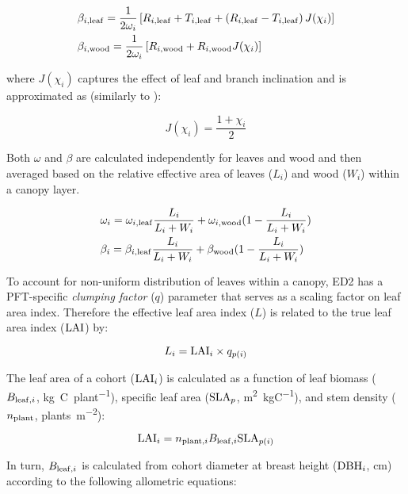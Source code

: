 \begin{align}
  & \beta_{i, \mathrm{leaf}} = \frac{1}{2 \omega_{i}} \left[R_{i, \mathrm{leaf}} + T_{i, \mathrm{leaf}} + \left( R_{i, \mathrm{leaf}} - T_{i, \mathrm{leaf}} \right) J(\chi_{i}) \right] \\
  & \beta_{i, \mathrm{wood}} = \frac{1}{2 \omega_{i}} \left[R_{i, \mathrm{wood}} +  R_{i, \mathrm{wood}} J(\chi_{i}) \right]
\end{align}

where $J(\chi_{i})$ captures the effect of leaf and branch inclination and is approximated as (similarly to \citealt{clm45_note}):

\begin{equation}
  J(\chi_{i}) = \frac{1 + \chi_{i}}{2}
\end{equation}

Both $\omega$ and $\beta$ are calculated independently for leaves and wood and then averaged based on the relative effective area of leaves ($L_{i}$) and wood ($W_{i}$) within a canopy layer.

\begin{align}
  & \omega_{i} = \omega_{i, \mathrm{leaf}} \frac{L_{i}}{L_{i} + W_{i}} + \omega_{i, \mathrm{wood}} (1 - \frac{L_{i}}{L_{i} + W_{i}}) \\
  & \beta_{i} = \beta_{i, \mathrm{leaf}} \frac{L_{i}}{L_{i} + W_{i}} + \beta_{\mathrm{wood}} (1 - \frac{L_{i}}{L_{i} + W_{i}})
\end{align}

To account for non-uniform distribution of leaves within a canopy, ED2 has a PFT-specific \emph{clumping factor} ($q$) parameter that serves as a scaling factor on leaf area index.
Therefore the effective leaf area index ($L$) is related to the true leaf area index ($\mathrm{LAI}$) by:

\begin{equation}
  \label{eqn:elai}
  L_{i} = \mathrm{LAI}_{i} \times q_{p(i)}
\end{equation}

The leaf area of a cohort ($\mathrm{LAI}_{i}$) is calculated as a function of leaf biomass ($B_{\mathrm{leaf}, i}$, \unit{kg C ~ plant^{-1}}), specific leaf area ($\mathrm{SLA}_{p}$, \unit{m^2 ~ kgC^{-1}}), and stem density ($n_{\mathrm{plant}}$, \unit{plants ~ m^{-2}}):

\begin{equation}
  \label{eqn:lai}
  \mathrm{LAI}_{i} = n_{\mathrm{plant}, i} B_{\mathrm{leaf}, i} \mathrm{SLA}_{p(i)}
\end{equation}

In turn, $B_{\mathrm{leaf}, i}$ is calculated from cohort diameter at breast height ($\mathrm{DBH}_{i}$, \unit{cm}) according to the following allometric equations:

